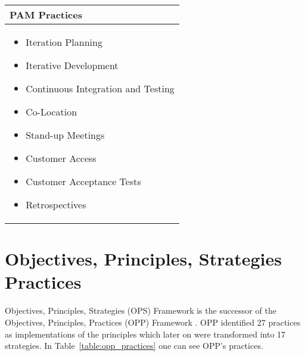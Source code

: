 \begin{table} [H]
  \begin{tabular}{| p{6.8cm} |}
    \hline
     \textbf{PAM Practices}\\ \hline
     \begin{itemize} \item Iteration Planning \item Iterative Development \item Continuous Integration and Testing \item Co-Location \item Stand-up Meetings \item Customer Access \item Customer Acceptance Tests \item Retrospectives \end{itemize}  \\ \hline
  \end{tabular}
  \label{table:pam_practices}
\end{table}

\section{Objectives, Principles, Strategies Practices}
Objectives, Principles, Strategies (OPS) Framework is the successor of the Objectives, Principles, Practices (OPP) Framework \cite{opp}. OPP identified 27 practices as implementations of the principles which later on were transformed into 17 strategies. In Table~\ref{table:opp_practices} one can see OPP's practices. 

